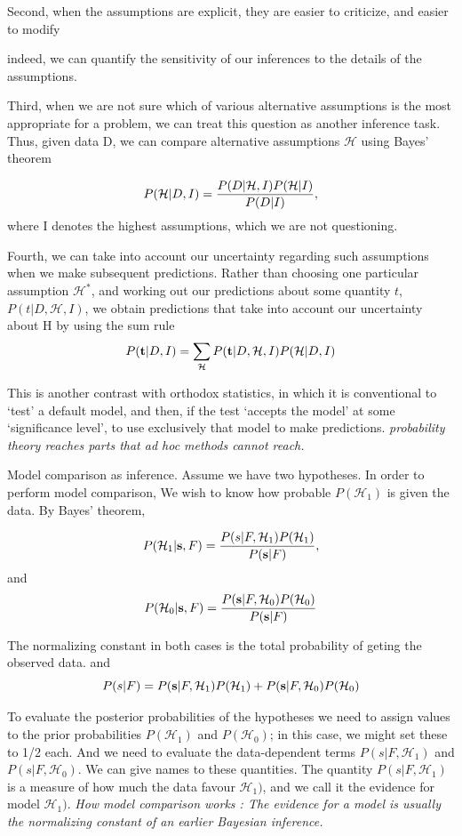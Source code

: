\documentclass[a4paper,11pt]{article}
\numberwithin{equation}{section}
\begin{document}
Second, when the assumptions are explicit, they are easier to criticize, and
easier to modify { indeed, we can quantify the sensitivity of our inferences to
the details of the assumptions.



Third, when we are not sure which of various alternative assumptions is
the most appropriate for a problem, we can treat this question as another
inference task. Thus, given data D, we can compare alternative assumptions
$\mathcal{H}$ using Bayes' theorem

$$
P( \mathcal{H}|D,I)= {P(D| \mathcal{H},I)P(\mathcal{H}|I) \over P(D|I)},
$$
where I denotes the highest assumptions, which we are not questioning.

Fourth, we can take into account our uncertainty regarding such assumptions
when we make subsequent predictions. Rather than choosing one particular
assumption $\mathcal{H}^*$, and working out our predictions about some quantity $t$,
$P(t |D, \mathcal{H},I)$, we obtain predictions that take into account our uncertainty 
about H by using the sum rule
$$
P({\textbf t} | D, I)= \sum_{\mathcal{H}} P({\textbf t}|D, \mathcal{H},I)P( \mathcal{H}|D,I) 
$$

This is another contrast with orthodox statistics, in which it is conventional
to `test' a default model, and then, if the test `accepts the model' at some
`significance level', to use exclusively that model to make predictions.
{\it probability theory reaches parts that ad hoc methods cannot reach.}



Model comparison as inference. Assume we have two hypotheses. In order to perform model comparison, We wish to
know how probable $P(\mathcal{H}_1)$ is given the data. By Bayes' theorem,

$$
P( \mathcal{H}_1|{\textbf s},F)= {P(s|F, \mathcal{H}_1)P(\mathcal{H}_1) \over P({\textbf s}|F)},
$$
and 
$$ 
P( \mathcal{H}_0|{\textbf s},F)= {P({\textbf s}|F, \mathcal{H}_0)P(\mathcal{H}_0) \over P({\textbf s}|F)}
$$

The normalizing constant in both cases is the total probability of geting the observed data. and 
$$
P(s|F)=P({\textbf s}|F, \mathcal{H}_1)P(\mathcal{H}_1) +P({\textbf s}|F, \mathcal{H}_0)P(\mathcal{H}_0)
$$

To evaluate the posterior probabilities of the hypotheses we need to assign
values to the prior probabilities $P(\mathcal{H}_1)$ and $P(\mathcal{H}_0)$; in this case, we might
set these to 1/2 each. And we need to evaluate the data-dependent terms
$P(s|F, \mathcal{H}_1)$ and $P(s|F,\mathcal{H}_0)$. We can give names to these quantities. The
quantity $P(s|F, \mathcal{H}_1)$  is a measure of how much the data favour $ \mathcal{H}_1)$, and we
call it the evidence for model $ \mathcal{H}_1)$. {\it How model comparison works : The evidence for a model is usually the normalizing constant of an earlier Bayesian inference.}

}
\end{document}

